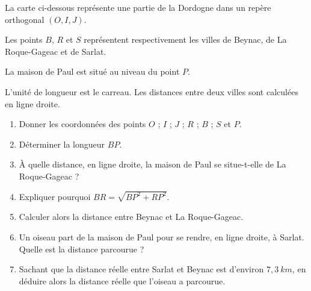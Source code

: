\documentclass[10pt,openright,twoside,french]{book}
\begin{document}

La carte ci-dessous représente une partie de la Dordogne dans un repère orthogonal $(O,I,J)$.\par
Les points $B$, $R$ et $S$ représentent respectivement les villes de Beynac, de La Roque-Gageac et de Sarlat.\par
La maison de Paul est situé au niveau du point $P$.\medskip

\begin{center}
\end{center}\medskip

L'unité de longueur est le carreau. Les distances entre deux villes sont calculées en ligne droite.

\begin{enumerate}
    \item Donner les coordonnées des points $O$ ; $I$ ; $J$ ; $R$ ; $B$ ; $S$ et $P$.
    \item Déterminer la longueur $BP$.
    \item À quelle distance, en ligne droite, la maison de Paul se situe-t-elle de La Roque-Gageac ?
    \item Expliquer pourquoi $BR = \sqrt{BP^2 + RP^2}$.
    \item Calculer alors la distance entre Beynac et La Roque-Gageac.
    \item Un oiseau part de la maison de Paul pour se rendre, en ligne droite, à Sarlat. Quelle est la distance parcourue ?
    \item Sachant que la distance réelle entre Sarlat et Beynac est d'environ $7{,}3~km$, en déduire alors la distance réelle que l'oiseau a parcourue.
\end{enumerate}
\end{document}
